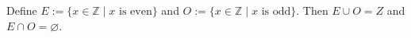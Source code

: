 Define $E := \{x \in \mathbb{Z} \mid x \text{ is even}\}$ and $O := \{x \in \mathbb{Z} \mid x \text{ is odd}\}$.
Then $E \cup O = Z$ and $E \cap O = \varnothing$.
